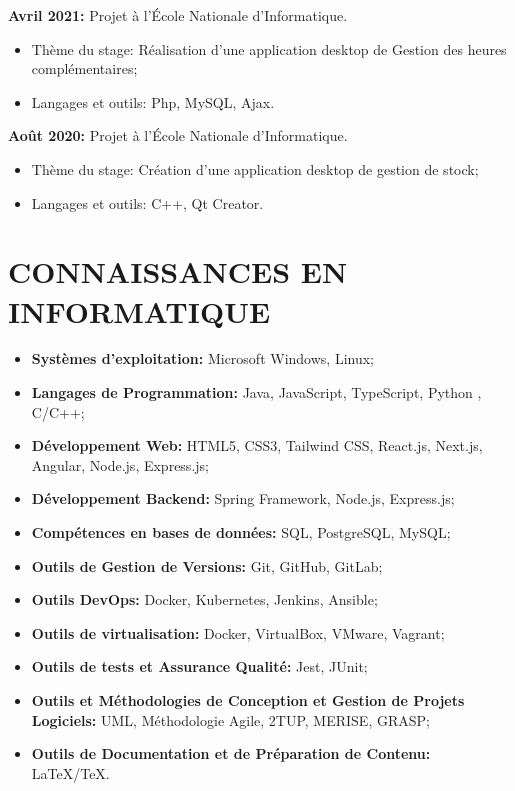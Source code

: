 \documentclass[12pt]{report}
\begin{document}
\begin{minipage}{\textwidth}
					\textbf{Avril 2021:} Projet à l’École Nationale d'Informatique.
						\begin{itemize}
							\item Thème du stage: Réalisation d’une application desktop de Gestion des heures complémentaires;
							\item Langages et outils: Php, MySQL, Ajax.								
						\end{itemize} 
					\textbf{Août 2020:} Projet à l’École Nationale d'Informatique.
						\begin{itemize}
							\item Thème du stage: Création d'une application desktop de gestion de stock;
							\item Langages et outils: C++, Qt Creator.								
						\end{itemize} 
   				\end{minipage}		
			\section*{CONNAISSANCES EN INFORMATIQUE}
			\begin{minipage}{\textwidth}
				\begin{itemize}
					\item \textbf{Systèmes d'exploitation:} Microsoft Windows, Linux;
					\item \textbf{Langages de Programmation:} Java, JavaScript, TypeScript, Python , C/C++;
					\item \textbf{Développement Web:} HTML5, CSS3, Tailwind CSS, React.js, Next.js, Angular, Node.js, Express.js;
					\item \textbf{Développement Backend:} Spring Framework, Node.js, Express.js;
					\item \textbf{Compétences en bases de données:} SQL, PostgreSQL, MySQL;
					\item \textbf{Outils de Gestion de Versions:} Git, GitHub, GitLab; 	
					\item \textbf{Outils DevOps:} Docker, Kubernetes, Jenkins, Ansible;
					\item \textbf{Outils de virtualisation:} Docker, VirtualBox, VMware, Vagrant; 	
					\item \textbf{Outils de tests et Assurance Qualité:} Jest, JUnit;
					\item \textbf{Outils et Méthodologies de Conception et Gestion de Projets Logiciels:} UML, Méthodologie Agile, 2TUP, MERISE, GRASP;
					\item \textbf{Outils de Documentation et de Préparation de Contenu:} LaTeX/TeX.	
				\end{itemize}

   			\end{minipage}		
\end{document}
